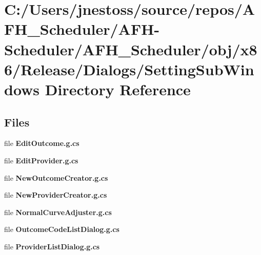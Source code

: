 \section{C\+:/\+Users/jnestoss/source/repos/\+A\+F\+H\+\_\+\+Scheduler/\+A\+F\+H-\/\+Scheduler/\+A\+F\+H\+\_\+\+Scheduler/obj/x86/\+Release/\+Dialogs/\+Setting\+Sub\+Windows Directory Reference}
\label{dir_f67aee4614122dc715bfaa57cd666f83}
\subsection*{Files}
\begin{DoxyCompactItemize}
\item 
file \textbf{ Edit\+Outcome.\+g.\+cs}
\item 
file \textbf{ Edit\+Provider.\+g.\+cs}
\item 
file \textbf{ New\+Outcome\+Creator.\+g.\+cs}
\item 
file \textbf{ New\+Provider\+Creator.\+g.\+cs}
\item 
file \textbf{ Normal\+Curve\+Adjuster.\+g.\+cs}
\item 
file \textbf{ Outcome\+Code\+List\+Dialog.\+g.\+cs}
\item 
file \textbf{ Provider\+List\+Dialog.\+g.\+cs}
\end{DoxyCompactItemize}
